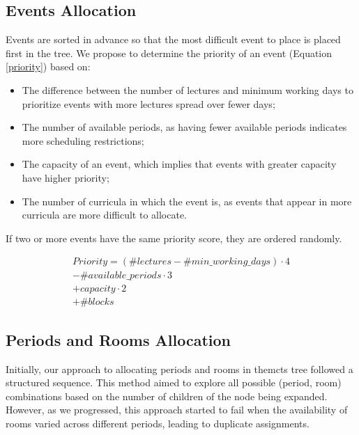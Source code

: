 \subsection{Events Allocation}

Events are sorted in advance so that the most difficult event to place is placed first in the tree. We propose to determine the priority of an event (Equation \ref{priority}) based on:

\begin{itemize}
\item The difference between the number of lectures and minimum working days to prioritize events with more lectures spread over fewer days;
\item The number of available periods, as having fewer available periods indicates more scheduling restrictions;
\item The capacity of an event, which implies that events with greater capacity have higher priority;
\item The number of curricula in which the event is, as events that appear in more curricula are more difficult to allocate.
\end{itemize}

If two or more events have the same priority score, they are ordered randomly.

\begin{equation}
  \begin{aligned}
	Priority = (\#lectures - \#min\_working\_days) \cdot 4 \\
	           - \#available\_periods \cdot 3 \\
	          + capacity \cdot 2 \\
	          + \#blocks\label{priority}
  \end{aligned}
\end{equation}


\subsection{Periods and Rooms Allocation}

Initially, our approach to allocating periods and rooms in the\ac{mcts} tree followed a structured sequence. This method aimed to explore all possible (period, room) combinations based on the number of children of the node being expanded. However, as we progressed, this approach started to fail when the availability of rooms varied across different periods, leading to duplicate assignments. 

